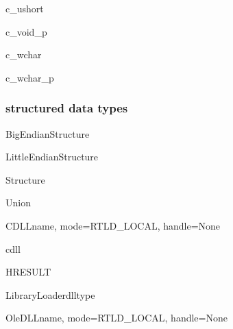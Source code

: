 \begin{classdesc}{c_ushort}{}
\end{classdesc}

\begin{classdesc}{c_void_p}{}
\end{classdesc}

\begin{classdesc}{c_wchar}{}
\end{classdesc}

\begin{classdesc}{c_wchar_p}{}
\end{classdesc}

\subsubsection{structured data types}

\begin{classdesc}{BigEndianStructure}{}
\end{classdesc}

\begin{classdesc}{LittleEndianStructure}{}
\end{classdesc}

\begin{classdesc}{Structure}{}
\end{classdesc}

\begin{classdesc}{Union}{}
\end{classdesc}



\begin{classdesc}{CDLL}{name, mode=RTLD_LOCAL, handle=None}
\end{classdesc}

\begin{datadesc}{cdll}
\end{datadesc}

\begin{classdesc}{HRESULT}{}
\end{classdesc}

\begin{classdesc}{LibraryLoader}{dlltype}
\end{classdesc}

\begin{classdesc}{OleDLL}{name, mode=RTLD_LOCAL, handle=None}
\end{classdesc}

